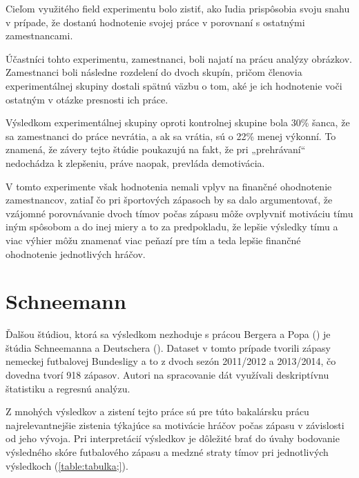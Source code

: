 \documentclass[
  digital, %
  oneside, %
  notable,   %
  lof,     %
  lot,     %
]{fithesis3}
\begin{document}
		Cieľom využitého field experimentu bolo zistiť, ako ľudia prispôsobia svoju snahu v prípade, že dostanú hodnotenie svojej práce v porovnaní s ostatnými zamestnancami. 
		
		Účastníci tohto experimentu, zamestnanci, boli najatí na prácu analýzy obrázkov. Zamestnanci boli následne rozdelení do dvoch skupín, pričom členovia experimentálnej skupiny dostali spätnú väzbu o tom, aké je ich hodnotenie voči ostatným v otázke presnosti ich práce. 
		
		Výsledkom experimentálnej skupiny oproti kontrolnej skupine bola 30\% šanca, že sa zamestnanci do práce nevrátia, a ak sa vrátia, sú o 22\% menej výkonní. To znamená, že závery tejto štúdie poukazujú na fakt, že pri „prehrávaní“ nedochádza k zlepšeniu, práve naopak, prevláda demotivácia. \parencite[s.~4]{barankay2010}
		
		V tomto experimente však hodnotenia nemali vplyv na finančné ohodnotenie zamestnancov, zatiaľ čo pri športových zápasoch by sa dalo argumentovať, že vzájomné porovnávanie dvoch tímov počas zápasu môže ovplyvniť motiváciu tímu iným spôsobom a do inej miery a to za predpokladu, že lepšie výsledky tímu a viac výhier môžu znamenať viac peňazí pre tím a teda lepšie finančné ohodnotenie jednotlivých hráčov.
		
		\section{Schneemann}
		Ďalšou štúdiou, ktorá sa výsledkom nezhoduje s prácou Bergera a Popa (\citeyear{berger2011}) je štúdia Schneemanna a Deutschera (\citeyear{schneemann2017}). Dataset v tomto prípade tvorili zápasy nemeckej futbalovej Bundesligy a to z dvoch sezón  2011/2012 a 2013/2014, čo dovedna tvorí 918 zápasov. Autori na spracovanie dát využívali deskriptívnu štatistiku a regresnú analýzu.
		
		Z mnohých výsledkov a zistení tejto práce sú pre túto bakalársku prácu najrelevantnejšie zistenia týkajúce sa motivácie hráčov počas zápasu v závislosti od jeho vývoja. Pri interpretácií výsledkov je dôležité brať do úvahy bodovanie výsledného skóre futbalového zápasu a medzné straty tímov pri jednotlivých výsledkoch (\ref{table:tabulka;}).
		
\end{document}

